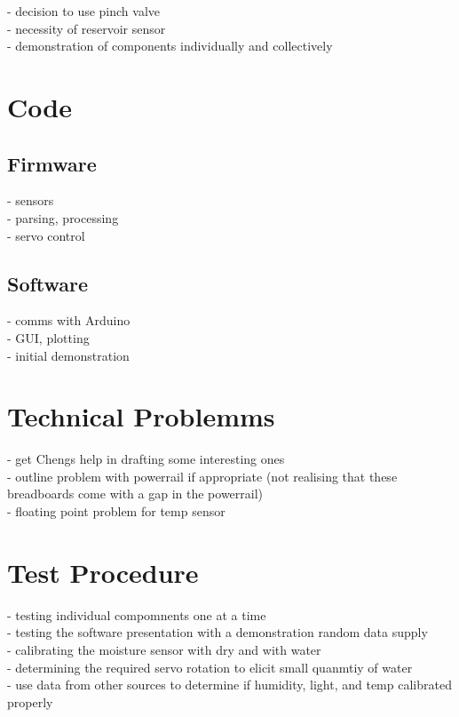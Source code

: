 \documentclass[a4paper,11pt]{article}
\begin{document}
- decision to use pinch valve\\
- necessity of reservoir sensor\\ 
- demonstration of components individually and collectively

\section{Code}
\label{sec:Code}
\subsection{Firmware}
\label{sec:Firmware}
- sensors\\
- parsing, processing\\
- servo control

\subsection{Software}
\label{sec:Software}
- comms with Arduino\\
- GUI, plotting\\
- initial demonstration

\section{Technical Problemms}
\label{sec:Technical_Problems}
- get Chengs help in drafting some interesting ones \\
- outline problem with powerrail if appropriate (not realising that these breadboards come with a gap in the powerrail)\\
- floating point problem for temp sensor

\section{Test Procedure}
\label{sec:Test_Procedure}
- testing individual compomnents one at a time \\
- testing the software presentation with a demonstration random data supply\\
- calibrating the moisture sensor with dry and with water\\
- determining the required servo rotation to elicit small quanmtiy of water\\
- use data from other sources to determine if humidity, light, and temp calibrated properly
\end{document}
